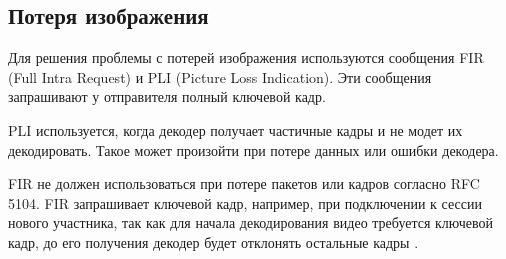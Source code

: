\subsection{Потеря изображения}

Для решения проблемы с потерей изображения используются сообщения FIR (Full Intra Request) и PLI (Picture Loss Indication). Эти сообщения запрашивают у отправителя полный ключевой кадр.

PLI используется, когда декодер получает частичные кадры и не модет их декодировать. Такое может произойти при потере данных или ошибки декодера.

FIR не должен использоваться при потере пакетов или кадров согласно RFC 5104. FIR запрашивает ключевой кадр, например, при подключении к сессии нового участника, так как для начала декодирования видео требуется ключевой кадр, до его получения декодер будет отклонять остальные кадры \cite{v16}.

\pagebreak